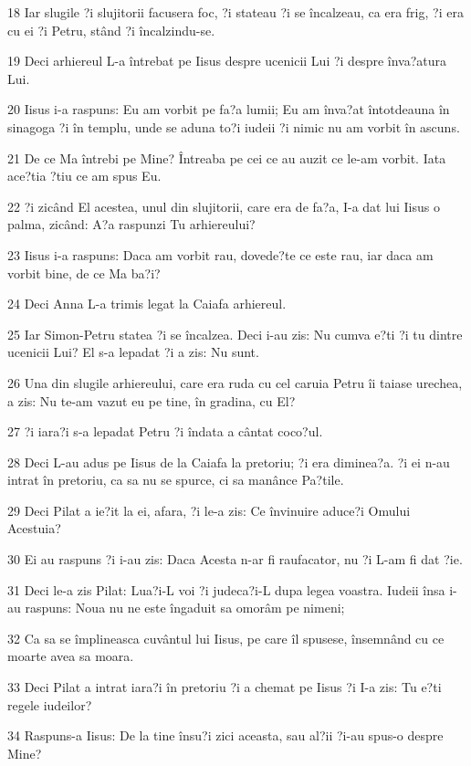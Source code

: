 \par 18 Iar slugile ?i slujitorii facusera foc, ?i stateau ?i se încalzeau, ca era frig, ?i era cu ei ?i Petru, stând ?i încalzindu-se.
\par 19 Deci arhiereul L-a întrebat pe Iisus despre ucenicii Lui ?i despre înva?atura Lui.
\par 20 Iisus i-a raspuns: Eu am vorbit pe fa?a lumii; Eu am înva?at întotdeauna în sinagoga ?i în templu, unde se aduna to?i iudeii ?i nimic nu am vorbit în ascuns.
\par 21 De ce Ma întrebi pe Mine? Întreaba pe cei ce au auzit ce le-am vorbit. Iata ace?tia ?tiu ce am spus Eu.
\par 22 ?i zicând El acestea, unul din slujitorii, care era de fa?a, I-a dat lui Iisus o palma, zicând: A?a raspunzi Tu arhiereului?
\par 23 Iisus i-a raspuns: Daca am vorbit rau, dovede?te ce este rau, iar daca am vorbit bine, de ce Ma ba?i?
\par 24 Deci Anna L-a trimis legat la Caiafa arhiereul.
\par 25 Iar Simon-Petru statea ?i se încalzea. Deci i-au zis: Nu cumva e?ti ?i tu dintre ucenicii Lui? El s-a lepadat ?i a zis: Nu sunt.
\par 26 Una din slugile arhiereului, care era ruda cu cel caruia Petru îi taiase urechea, a zis: Nu te-am vazut eu pe tine, în gradina, cu El?
\par 27 ?i iara?i s-a lepadat Petru ?i îndata a cântat coco?ul.
\par 28 Deci L-au adus pe Iisus de la Caiafa la pretoriu; ?i era diminea?a. ?i ei n-au intrat în pretoriu, ca sa nu se spurce, ci sa manânce Pa?tile.
\par 29 Deci Pilat a ie?it la ei, afara, ?i le-a zis: Ce învinuire aduce?i Omului Acestuia?
\par 30 Ei au raspuns ?i i-au zis: Daca Acesta n-ar fi raufacator, nu ?i L-am fi dat ?ie.
\par 31 Deci le-a zis Pilat: Lua?i-L voi ?i judeca?i-L dupa legea voastra. Iudeii însa i-au raspuns: Noua nu ne este îngaduit sa omorâm pe nimeni;
\par 32 Ca sa se împlineasca cuvântul lui Iisus, pe care îl spusese, însemnând cu ce moarte avea sa moara.
\par 33 Deci Pilat a intrat iara?i în pretoriu ?i a chemat pe Iisus ?i I-a zis: Tu e?ti regele iudeilor?
\par 34 Raspuns-a Iisus: De la tine însu?i zici aceasta, sau al?ii ?i-au spus-o despre Mine?
